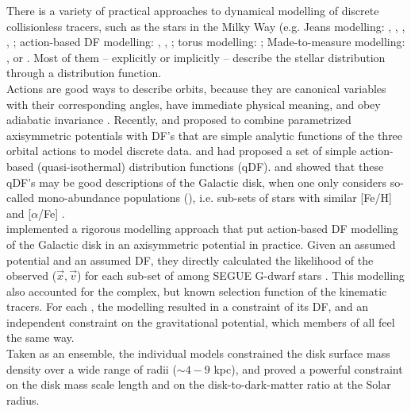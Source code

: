 There is a variety of practical approaches to dynamical modelling of discrete collisionless tracers, such as the stars in the Milky Way (e.g. Jeans modelling: \citet{1989MNRAS.239..605K}, \citet{2012ApJ...756...89B}, \citet{2012MNRAS.425.1445G}, \citet{2013ApJ...772..108Z}, \citet{2015MNRAS.452..956B}; action-based DF modelling: \citet{2013ApJ...779..115B}, \citet{2014MNRAS.445.3133P}, \citet{2015MNRAS.449.3479S}; torus modelling:  \citet{2012MNRAS.419.2251M,2013MNRAS.433.1411M}; Made-to-measure modelling: \citet{sye96}, \citet{2007MNRAS.376...71D} or \citet{2014MNRAS.443.2112H}. Most of them -- explicitly or implicitly -- describe the stellar distribution through a distribution function. \\

Actions are good ways to describe orbits, because they are canonical variables with their corresponding angles, have immediate physical meaning, and obey adiabatic invariance \citep{2008gady.book.....B,2008MNRAS.390..429M,2010MNRAS.401.2318B,2011MNRAS.413.1889B,2011Prama..77...39B}. Recently, \citet{2012MNRAS.426.1328B} and \citet{2013ApJ...779..115B}  proposed to combine parametrized axisymmetric potentials with DF's that are simple analytic functions of the three orbital actions to model discrete data. \citet{2010MNRAS.401.2318B} and \citet{2011MNRAS.413.1889B} had proposed a set of simple action-based (quasi-isothermal) distribution functions (qDF). \citet{2013MNRAS.434..652T} and \citet{2013ApJ...779..115B} showed that these qDF's may be good descriptions of the Galactic disk, when one only considers so-called mono-abundance populations (\MAP{}), i.e. sub-sets of stars with similar [Fe/H] and [$\alpha$/Fe] \citep{bov12b,bov12c,2012ApJ...753..148B}. \\

\citet{2013ApJ...779..115B} implemented a rigorous modelling approach that put action-based DF modelling of the Galactic disk in an axisymmetric potential in practice. Given an assumed potential and an assumed DF, they directly calculated the likelihood of the observed ($\vec{x},\vec{v}$) for each sub-set of \MAP{} among SEGUE G-dwarf stars \citep{2009AJ....137.4377Y}. This modelling also accounted for the complex, but known selection function of the kinematic tracers.  For each \MAP{}, the modelling resulted in a constraint of its DF, and an independent constraint on the gravitational potential, which members of all \MAPs{} feel the same way. \\
Taken as an ensemble, the individual \MAP{} models constrained the disk surface mass density over a wide range of radii ($\sim 4-9$ kpc), and proved a powerful constraint on the disk mass scale length and on the disk-to-dark-matter ratio at the Solar radius. \\


